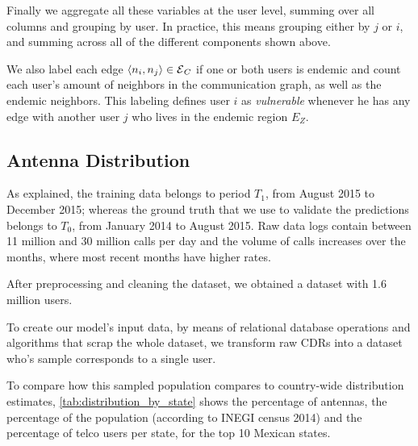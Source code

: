
Finally we aggregate all these variables at the user level, summing over all columns and grouping by user.
In practice, this means grouping either by $j$ or $i$, and summing across all of the different components shown above.

We also label each edge $\left< n_i, n_j \right> \in \operatorname{\mathcal{E}}_C$ if one or both users is endemic and count each user's amount of neighbors in the communication graph, as well as the endemic neighbors.
This labeling defines user $i$ as \textit{vulnerable} whenever he has any edge with another user $j$ who lives in the endemic region $E_Z$.



\subsection{Antenna Distribution}\label{subsection:antenna_distribution}

As explained, the training data belongs to period $T_1$, from August 2015 to December 2015;
whereas the ground truth that we use to validate the predictions belongs to $T_0$, from January 2014 to August 2015.
Raw data logs contain between 11 million and 30 million calls per day and the volume of calls increases over the months, where most recent months have higher rates.

After preprocessing and cleaning the dataset, we obtained a dataset with 1.6 million users.

To create our model's input data, by means of relational database operations and algorithms that scrap the whole dataset, we transform raw CDRs into a dataset who's sample corresponds to a single user.


To compare how this sampled population compares to country-wide distribution estimates,
\cref{tab:distribution_by_state} shows the percentage of antennas, the percentage of the population (according to INEGI census 2014) and
the percentage of telco users per state, for the top 10 Mexican states.


